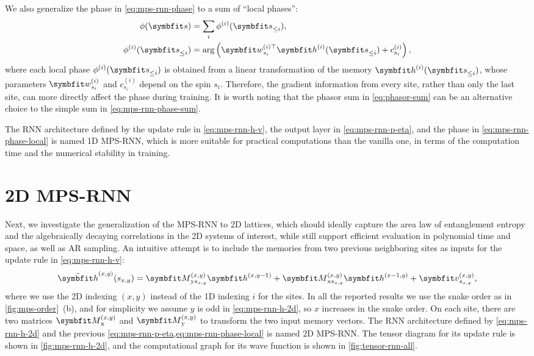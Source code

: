 We also generalize the phase in \cref{eq:mps-rnn-phase} to a sum of ``local phases'':
\begin{align}
\phi(\vs) &= \sum_i \phi^{(i)}(\vs_{\le i}), \label{eq:mps-rnn-phase-sum} \\
\phi^{(i)}(\vs_{\le i}) &= \arg\left( \vw^{(i) \transpose}_{s_i} \vh^{(i)}(\vs_{\le i}) + c^{(i)}_{s_i} \right), \label{eq:mps-rnn-phase-local}
\end{align}
where each local phase $\phi^{(i)}(\vs_{\le i})$ is obtained from a linear transformation of the memory $\vh^{(i)}(\vs_{\le i})$, whose parameters $\vw^{(i)}_{s_i}$ and $c^{(i)}_{s_i}$ depend on the spin $s_i$. Therefore, the gradient information from every site, rather than only the last site, can more directly affect the phase during training. It is worth noting that the phasor sum in \cref{eq:phasor-sum} can be an alternative choice to the simple sum in \cref{eq:mps-rnn-phase-sum}.

The RNN architecture defined by the update rule in \cref{eq:mps-rnn-h-v}, the output layer in \cref{eq:mps-rnn-p-eta}, and the phase in \cref{eq:mps-rnn-phase-local} is named 1D MPS-RNN, which is more suitable for practical computations than the vanilla one, in terms of the computation time and the numerical stability in training.

\section{2D MPS-RNN}

Next, we investigate the generalization of the MPS-RNN to 2D lattices, which should ideally capture the area law of entanglement entropy and the algebraically decaying correlations in the 2D systems of interest, while still support efficient evaluation in polynomial time and space, as well as AR sampling. An intuitive attempt is to include the memories from two previous neighboring sites as inputs for the update rule in \cref{eq:mps-rnn-h-v}:
\begin{equation}
\tilde{\vh}^{(x, y)}(s_{x, y}) =
\mM^{(x, y)}_{\text{y} s_{x, y}} \vh^{(x, y - 1)}
+ \mM^{(x, y)}_{\text{x} s_{x, y}} \vh^{(x - 1, y)}
+ \vv^{(x, y)}_{s_{x, y}},
\label{eq:mps-rnn-h-2d}
\end{equation}
where we use the 2D indexing $(x, y)$ instead of the 1D indexing $i$ for the sites. In all the reported results we use the snake order as in \cref{fig:mps-order}~(b), and for simplicity we assume $y$ is odd in \cref{eq:mps-rnn-h-2d}, so $x$ increases in the snake order. On each site, there are two matrices $\mM^{(x, y)}_\text{x}$ and $\mM^{(x, y)}_\text{y}$ to transform the two input memory vectors. The RNN architecture defined by \cref{eq:mps-rnn-h-2d} and the previous \cref{eq:mps-rnn-p-eta,eq:mps-rnn-phase-local} is named 2D MPS-RNN. The tensor diagram for its update rule is shown in \cref{fig:mps-rnn-h-2d}, and the computational graph for its wave function is shown in \cref{fig:tensor-rnn-all}.

